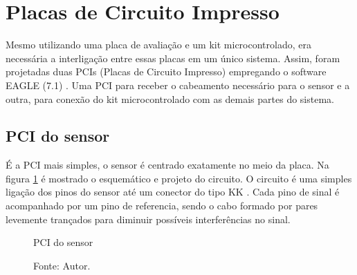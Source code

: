 \section{Placas de Circuito Impresso}

Mesmo utilizando uma placa de avaliação e um kit microcontrolado, era necessária a interligação entre essas placas em um único sistema. Assim, foram projetadas duas PCIs (Placas de Circuito Impresso)  empregando o software EAGLE (7.1) \cite{EagleWiki}. Uma PCI para receber o cabeamento necessário para o sensor e a outra, para conexão do kit microcontrolado com as demais partes do sistema. 

\subsection{PCI do sensor}

É a PCI mais simples, o sensor é centrado exatamente no meio da placa. Na figura \ref{fig:esqDesSens} é mostrado o esquemático e projeto do circuito. O circuito é uma simples ligação dos pinos do sensor até um conector do tipo KK \cite{KKcon}. Cada pino de sinal é acompanhado por um pino de referencia, sendo o cabo formado por pares levemente trançados para diminuir possíveis interferências no sinal.

\begin{figure}[H]
    \centering
     \caption{PCI do sensor}
     \caption*{Fonte: Autor.}\label{fig:esqDesSens}
\end{figure}


